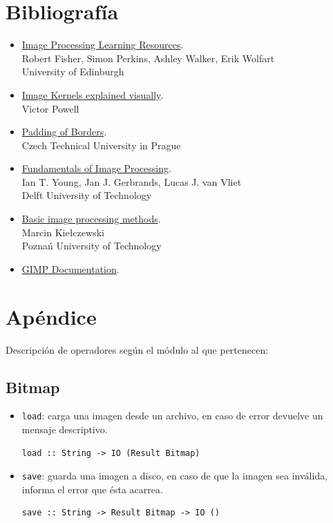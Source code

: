\documentclass[a4paper, 11pt]{article} %
\begin{document}

\section*{Bibliografía}

	\begin{itemize} 
		\item \href{http://homepages.inf.ed.ac.uk/rbf/HIPR2/hipr_top.htm}{Image Processing Learning Resources}.\\
		Robert Fisher, Simon Perkins, Ashley Walker, Erik Wolfart\\
		University of Edinburgh
		\item \href{http://setosa.io/ev/image-kernels/}{Image Kernels explained visually}.\\
		Victor Powell
		\item \href{http://radio.feld.cvut.cz/matlab/toolbox/images/linfilt4.html}{Padding of Borders}.\\
		Czech Technical University in Prague
		\item \href{http://homepages.inf.ed.ac.uk/rbf/CVonline/LOCAL_COPIES/TUDELFT/FIP2_3.pdf}{Fundamentals of Image Processing}.\\		
		Ian T. Young, Jan J. Gerbrands, Lucas J. van Vliet\\
		Delft University of Technology
		\item \href{http://etacar.put.poznan.pl/marcin.kielczewski/VBC5.pdf}{Basic image processing methods}.\\		
		Marcin Kiełczewski\\
		Poznań University of Technology
		\item \href{http://docs.gimp.org/2.6/en/}{GIMP Documentation}.\\
	\end{itemize}
\pagebreak


\section*{Apéndice}
Descripción de operadores según el módulo al que pertenecen:

	
\subsection*{Bitmap}
	\begin{itemize} 
		\item \texttt{load}: carga una imagen desde un archivo, en caso de error devuelve un mensaje descriptivo.
\begin{lstlisting}
load :: String -> IO (Result Bitmap)
\end{lstlisting}
		\item \texttt{save}: guarda una imagen a disco, en caso de que la imagen sea inválida, informa el error que ésta acarrea.
\begin{lstlisting} 
save :: String -> Result Bitmap -> IO ()
\end{lstlisting}
	\end{itemize}
	
\end{document}
